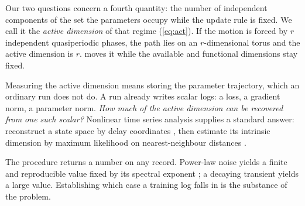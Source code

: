 \documentclass[twoside]{article}
\begin{document}
Our two questions concern a fourth quantity: the number of independent components of the set the
parameters occupy while the update rule is fixed. We call it the \emph{active dimension} of that
regime (\cref{eq:act}). If the motion is forced by $r$ independent
quasiperiodic phases, the path lies on an $r$-dimensional torus and the active dimension is $r$.
 moves it while the available and functional dimensions stay fixed.

Measuring the active dimension means storing the parameter trajectory, which an ordinary run does
not do. A run already writes scalar logs: a loss, a gradient norm, a parameter norm.
\emph{How much of the active dimension can be recovered from one such scalar?} Nonlinear time
series analysis supplies a standard answer: reconstruct a state space by delay coordinates
\citep{takens1981detecting, sauer1991embedology}, then estimate its intrinsic dimension by maximum
likelihood on nearest-neighbour distances \citep{levina2004maximum, mackay2005comments}.

The procedure returns a number on any record. Power-law noise yields a finite and reproducible
value fixed by its spectral exponent \citep{osborne1989finite, theiler1991some}; a decaying
transient yields a large value. Establishing which case a training log falls in is the substance of
the problem.
\end{document}
